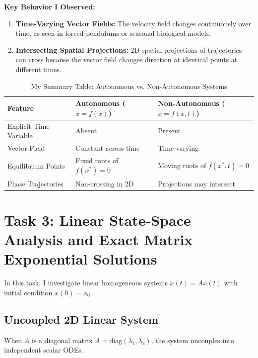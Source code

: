 \documentclass[12pt,a4paper]{article}
\theoremstyle{definition}
\theoremstyle{plain}
\begin{document}
\textbf{Key Behavior I Observed:}
\begin{enumerate}
    \item \textbf{Time-Varying Vector Fields:} The velocity field changes continuously over time, as seen in forced pendulums or seasonal biological models.
    \item \textbf{Intersecting Spatial Projections:} 2D spatial projections of trajectories can cross because the vector field changes direction at identical points at different times.
\end{enumerate}

\begin{table}[h]
\centering
\caption{My Summary Table: Autonomous vs. Non-Autonomous Systems}
\vspace{0.3em}
\begin{tabular}{lll}
\toprule
\textbf{Feature} & \textbf{Autonomous ($\dot{x} = f(x)$)} & \textbf{Non-Autonomous ($\dot{x} = f(x,t)$)} \\
\midrule
Explicit Time Variable & Absent & Present \\
Vector Field & Constant across time & Time-varying \\
Equilibrium Points & Fixed roots of $f(x^*)=0$ & Moving roots of $f(x^*,t)=0$ \\
Phase Trajectories & Non-crossing in 2D & Projections may intersect \\
\bottomrule
\end{tabular}
\end{table}

\newpage
\section{Task 3: Linear State-Space Analysis and Exact Matrix Exponential Solutions}

In this task, I investigate linear homogeneous systems $\dot{x}(t) = A x(t)$ with initial condition $x(0) = x_0$.

\subsection{Uncoupled 2D Linear System}
When $A$ is a diagonal matrix $A = \text{diag}(\lambda_1, \lambda_2)$, the system uncouples into independent scalar ODEs.
\end{document}
